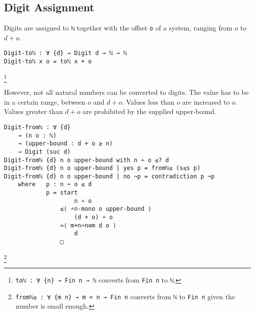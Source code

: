 \documentclass[\main/thesis.tex]{subfiles}
\begin{document}
\subsection{Digit Assignment}

\begin{center}
    \begin{adjustbox}{max width=\textwidth}
    \end{adjustbox}
\end{center}

Digits are assigned to {\lstinline|ℕ|} together with the offset {\lstinline|o|} of a system,
ranging from $ o $ to $ d + o $.

\begin{lstlisting}
Digit-toℕ : ∀ {d} → Digit d → ℕ → ℕ
Digit-toℕ x o = toℕ x + o
\end{lstlisting}
\footnote{
    {\lstinline|toℕ : ∀ {n} → Fin n → ℕ|}
    \newline\hspace*{4em} converts from {\lstinline|Fin n|} to {\lstinline|ℕ|}.
}


However, not all natural numbers can be converted to digits.
The value has to be in a certain range, between $ o $ and $ d + o $.
Values less than $ o $ are increased to $ o $.
Values greater than $ d + o $ are prohibited by the supplied upper-bound.

\begin{lstlisting}
Digit-fromℕ : ∀ {d}
    → (n o : ℕ)
    → (upper-bound : d + o ≥ n)
    → Digit (suc d)
Digit-fromℕ {d} n o upper-bound with n ∸ o ≤? d
Digit-fromℕ {d} n o upper-bound | yes p = fromℕ≤ (s≤s p)
Digit-fromℕ {d} n o upper-bound | no ¬p = contradiction p ¬p
    where   p : n ∸ o ≤ d
            p = start
                    n ∸ o
                ≤⟨ ∸n-mono o upper-bound ⟩
                    (d + o) ∸ o
                ≈⟨ m+n∸n≡m d o ⟩
                    d
                □
\end{lstlisting}
\footnote{
    {\lstinline|fromℕ≤ : ∀ {m n} → m < n → Fin n|}
    \newline\hspace*{4em} converts from {\lstinline|ℕ|} to {\lstinline|Fin n|} given the number is small enough.
}
\end{document}
